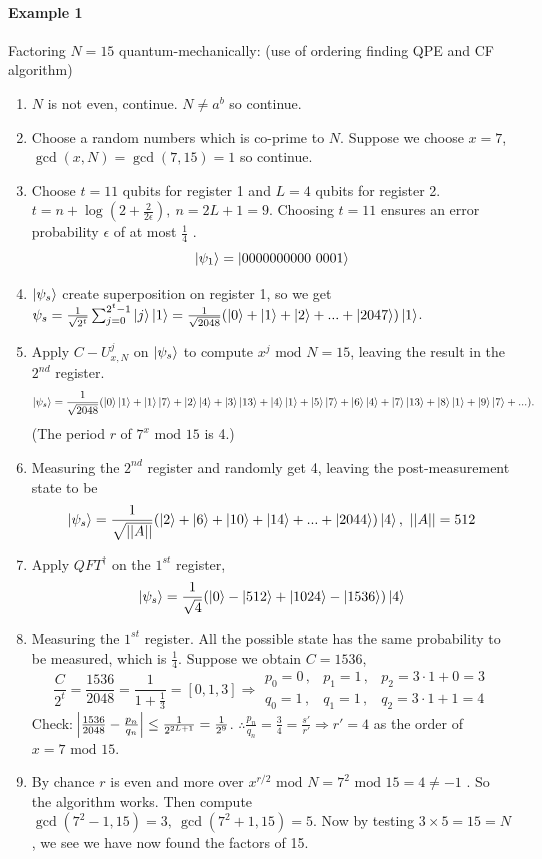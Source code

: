 \documentclass[]{book}
\theoremstyle{nonumberplain}
\begin{document}
\paragraph{Example 1}
    Factoring $N=15$ quantum-mechanically: (use of ordering finding QPE and CF algorithm)
    \begin{enumerate}
        \item $N$ is not even, continue. $N \neq a^b$ so continue.
        \item Choose a random numbers which is co-prime to $N$. Suppose we choose $x=7$, $\gcd(x,N)=\gcd(7,15)=1$ so continue.
        \item Choose $t=11$ qubits for register 1 and $L=4$ qubits for register 2. $t=n+\log(2+\frac{2}{2\epsilon}), \ n=2L+1=9$. Choosing $t=11$ ensures an error probability $\epsilon$ of at most $\frac{1}{4}$ .
        $$\ket{\psi_1} = \ket{0000000000 \ 0001}$$
        \item $\ket{\psi_s} $ create superposition on register 1, so we get $\psi_s = \frac{1}{\sqrt{2^t}} \sum_{j=0}^{2^t-1} \ket{j}\ket{1} = \frac{1}{\sqrt{2048}}(\ket{0}+\ket{1}+\ket{2}+...+\ket{2047})\ket{1} $.
        \item Apply $C-U^{j}_{x,N} $ on $\ket{\psi_s}$ to compute $x^j \text{ mod }N=15$, leaving the result in the $2^{nd}$ register.
        $$\ket{\psi_s} = \frac{1}{\sqrt{2048}} (\ket{0}\ket{1}+\ket{1}\ket{7}+\ket{2}\ket{4}+\ket{3}\ket{13}+\ket{4}\ket{1}+\ket{5}\ket{7}+\ket{6}\ket{4}+\ket{7}\ket{13}+\ket{8}\ket{1}+\ket{9}\ket{7}+...).$$ (The period $r$ of $7^x \text{ mod }15$ is 4.)
        \item Measuring the $2^{nd}$ register and randomly get 4, leaving the post-measurement state to be
        $$\ket{\psi_s} = \frac{1}{\sqrt{||A||}} (\ket{2}+\ket{6}+\ket{10}+\ket{14}+...+\ket{2044})\ket{4}, \ ||A||=512$$
        \item Apply $QFT^{\dagger}$ on the $1^{st}$ register,
        $$\ket{\psi_s}=\frac{1}{\sqrt{4}}(\ket{0}-\ket{512}+\ket{1024}-\ket{1536})\ket{4}$$
        \item Measuring the $1^{st}$ register. All the possible state has the same probability to be measured, which is $\frac{1}{4}$.
        Suppose we obtain $C=1536$,
        \[
        \frac{C}{2^t}=\frac{1536}{2048}=\frac{1}{1+\frac{1}{3}}=[0,1,3] \Rightarrow 
        \begin{matrix}
            p_0 = 0\,, & p_1 = 1\,, & p_2 = 3 \cdot 1 + 0 = 3\\
            q_0 = 1\,, & q_1 = 1\,, & q_2 = 3 \cdot 1 + 1 = 4
        \end{matrix}
        \]
        Check: $\abs{\frac{1536}{2048}-\frac{p_n}{q_n}} \leq \frac{1}{2^{2L+1}} = \frac{1}{2^9}$.
        $\therefore \frac{p_n}{q_n}=\frac{3}{4}=\frac{s'}{r'} \Rightarrow r'=4$ as the order of $x=7 \text{ mod }15$.
        \item By chance $r$ is even and more over $ x^{r/2} \text{ mod }N=7^2 \text{ mod }15 = 4 \neq -1$ . So the algorithm works. Then compute $\gcd(7^2-1,15)=3, \ \gcd(7^2+1,15)=5$. Now by testing $3 \times 5 = 15 = N$, we see we have now found the factors of 15.
    \end{enumerate}
\end{document}
